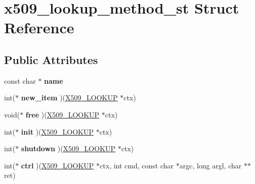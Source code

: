 \hypertarget{structx509__lookup__method__st}{}\section{x509\+\_\+lookup\+\_\+method\+\_\+st Struct Reference}
\label{structx509__lookup__method__st}
\subsection*{Public Attributes}
\begin{DoxyCompactItemize}
\item 
\mbox{\label{structx509__lookup__method__st_a57a76d2d34d7749b3874c7809337390c}} 
const char $\ast$ {\bfseries name}
\item 
\mbox{\label{structx509__lookup__method__st_a308b007d8cb1b10bc525d9a8a794926e}} 
int($\ast$ {\bfseries new\+\_\+item} )(\hyperlink{structx509__lookup__st}{X509\+\_\+\+L\+O\+O\+K\+UP} $\ast$ctx)
\item 
\mbox{\label{structx509__lookup__method__st_a0ef0e21d7fe023bc976d002e1dd5a810}} 
void($\ast$ {\bfseries free} )(\hyperlink{structx509__lookup__st}{X509\+\_\+\+L\+O\+O\+K\+UP} $\ast$ctx)
\item 
\mbox{\label{structx509__lookup__method__st_a04ca0ebad723cae3fa9cb487c56e09a0}} 
int($\ast$ {\bfseries init} )(\hyperlink{structx509__lookup__st}{X509\+\_\+\+L\+O\+O\+K\+UP} $\ast$ctx)
\item 
\mbox{\label{structx509__lookup__method__st_aa201108d16466a85c87dd0b86288087a}} 
int($\ast$ {\bfseries shutdown} )(\hyperlink{structx509__lookup__st}{X509\+\_\+\+L\+O\+O\+K\+UP} $\ast$ctx)
\item 
\mbox{\label{structx509__lookup__method__st_a87357ddd14742495a20e4e7be7cdfab2}} 
int($\ast$ {\bfseries ctrl} )(\hyperlink{structx509__lookup__st}{X509\+\_\+\+L\+O\+O\+K\+UP} $\ast$ctx, int cmd, const char $\ast$argc, long argl, char $\ast$$\ast$ret)
\item 
\mbox{\label{structx509__lookup__method__st_a2d6e3c3cc73f583d6d970abe12b65df2}} 
$$
\end{DoxyCompactItemize}
